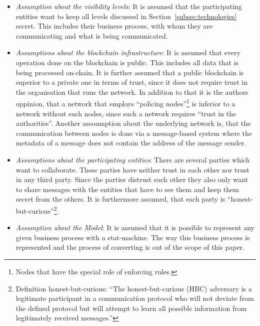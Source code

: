\documentclass[runningheads]{llncs}
\newcommand{\refsec}[1]{Section~\ref{#1}}
\newcommand{\quotel}{``}
\newcommand{\quoter}{''}
\begin{document}
\begin{itemize}
    \item \textit{Assumption about the visibility levels}: It is assumed that the participating entities want to keep all levels discussed in \refsec{subsec:technologies} secret. This includes their business process, with whom they are communicating and what is being communicated. 
    \item \textit{Assumptions about the blockchain infrastructure}: It is assumed that every operation done on the blockchain is public. This includes all data that is being processed on-chain. It is further assumed that a public blockchain is superior to a private one in terms of trust, since it does not require trust in the organisation that runs the network. In addition to that it is the authors oppinion, that a network that employs \quotel  policing nodes\quoter \footnote{Nodes that have the special role of enforcing rules.} is inferior to a network without such nodes, since such a network requires \quotel trust in the authorities\quoter. Another assoumption about the underlying network is, that the communication between nodes is done via a message-based system where the metadata of a message does not contain the address of the message sender.
    \item \textit{Assumptions about the participating entities}: There are several parties which want to collaborate. These parties have neither trust in each other nor  trust in any third party. Since the parties distrust each other they also  only want to share messages with the entities that have to see them and keep them secret from the others.
    It is furthermore assumed, that each party  is  \quotel  honest-but-curious\quoter  \footnote{Definition honest-but-curious:  \quotel The honest-but-curious (HBC) adversary is a legitimate participant in a communication protocol who will not deviate from the defined protocol but will attempt to learn all possible information from legitimately received messages.\quoter  \cite{paverd2014modelling}}.
    \item \textit{Assumption about the Model}: It is assumed that it is possible to represent any given business process with a stat-machine. The way this business process is represented and the process of converting is out of the scope of this paper.
\end{itemize}
\end{document}
